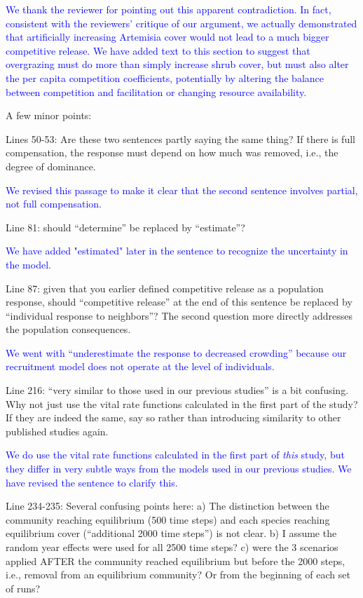 \documentclass[12pt]{article}
\newcommand{\response}{\textcolor{blue}}
\begin{document}
\response{We thank the reviewer for pointing out this apparent contradiction. In fact, consistent with 
the reviewers' critique of our argument, we actually demonstrated that 
artificially increasing Artemisia cover would not lead to a much bigger competitive release. We have added text to this 
section to suggest that overgrazing must do more than simply increase shrub cover, but must also alter
the per capita competition coefficients, potentially by altering the balance between competition and facilitation
or changing resource availability. }

A few minor points:

Lines 50-53: Are these two sentences partly saying the same thing? If there is full compensation, the
response must depend on how much was removed, i.e., the degree of dominance.

\response{We revised this passage to make it clear that the second sentence involves partial, not full
compensation.}

Line 81: should ``determine'' be replaced by ``estimate''?

\response{We have added "estimated" later in the sentence to recognize the uncertainty in the model.}

Line 87: given that you earlier defined competitive release as a population response, should
``competitive release'' at the end of this sentence be replaced by ``individual response to neighbors''?
The second question more directly addresses the population consequences.

\response{We went with ``underestimate the response to decreased crowding'' because our recruitment model does not operate 
at the level of individuals.}

Line 216: ``very similar to those used in our previous studies'' is a bit confusing. Why not just use the
vital rate functions calculated in the first part of the study? If they are indeed the same, say so rather
than introducing similarity to other published studies again.

\response{We do use the vital rate functions calculated in the first part of \emph{this} study, but they differ in very subtle ways 
from the models used in our previous studies. We have revised the sentence to clarify this.}

Line 234-235: Several confusing points here: a) The distinction between the community reaching
equilibrium (500 time steps) and each species reaching equilibrium cover (``additional 2000 time steps'')
is not clear. b) I assume the random year effects were used for all 2500 time steps? c) were the 3
scenarios applied AFTER the community reached equilibrium but before the 2000 steps, i.e., removal
from an equilibrium community? Or from the beginning of each set of runs?
\end{document}
